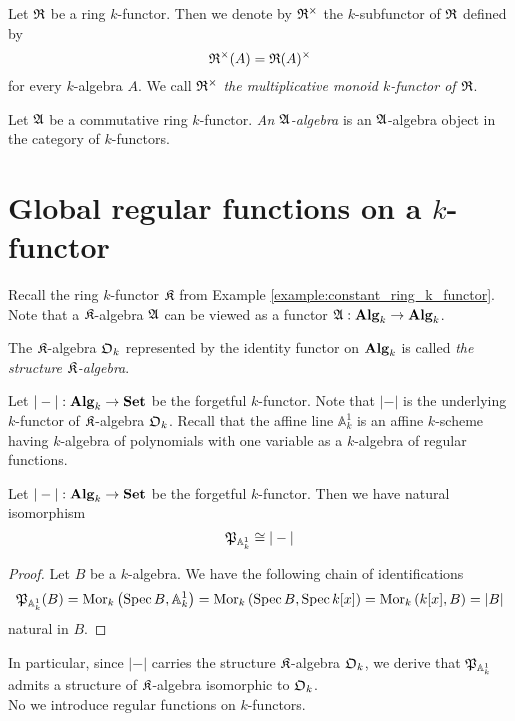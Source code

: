 \begin{definition}
Let ${\mathfrak R}$ be a ring $k$-functor. Then we denote by ${\mathfrak R}^{\times}$ the $k$-subfunctor of ${\mathfrak R}$ defined by
$${\mathfrak R}^{\times}(A) = {\mathfrak R}(A)^{\times}$$
for every $k$-algebra $A$. We call ${\mathfrak R}^{\times}$ \textit{the multiplicative monoid $k$-functor of ${\mathfrak R}$}.
\end{definition}

\begin{definition}
Let ${\mathfrak A}$ be a commutative ring $k$-functor. \textit{An ${\mathfrak A}$-algebra} is an ${\mathfrak A}$-algebra object in the category of $k$-functors.
\end{definition}

\section{Global regular functions on a $k$-functor}
\noindent
Recall the ring $k$-functor ${\mathfrak K}$ from Example \ref{example:constant_ring_k_functor}. Note that a ${\mathfrak K}$-algebra ${\mathfrak A}$ can be viewed as a functor ${\mathfrak A}:\mathbf{Alg}_k\rightarrow \mathbf{Alg}_k$.

\begin{definition}
The ${\mathfrak K}$-algebra ${\mathfrak O}_k$ represented by the identity functor on $\mathbf{Alg}_k$ is called \textit{the structure ${\mathfrak K}$-algebra}.
\end{definition}
\noindent
Let $|-|:\mathbf{Alg}_k\rightarrow \mathbf{Set}$ be the forgetful $k$-functor. Note that $|-|$ is the underlying $k$-functor of ${\mathfrak K}$-algebra ${\mathfrak O}_k$. Recall that the affine line $\mathbb{A}^1_k$ is an affine $k$-scheme having $k$-algebra of polynomials with one variable as a $k$-algebra of regular functions.

\begin{fact}\label{fact:affineline_as_forgetfulfunctor}
Let $|-|:\mathbf{Alg}_k\rightarrow \mathbf{Set}$ be the forgetful $k$-functor. Then we have natural isomorphism
$${\mathfrak P}_{\mathbb{A}^1_k} \cong |-|$$
\end{fact}
\begin{proof}
Let $B$ be a $k$-algebra. We have the following chain of identifications
$${\mathfrak P}_{\mathbb{A}^1_k}(B) = \mathrm{Mor}_k\left(\mathrm{Spec}\, B, \mathbb{A}^1_k\right) = \mathrm{Mor}_k\left(\mathrm{Spec}\, B, \mathrm{Spec}\, k[x]\right) = \mathrm{Mor}_k\left(k[x], B\right) = |B|$$
natural in $B$.
\end{proof}
\noindent
In particular, since $|-|$ carries the structure ${\mathfrak K}$-algebra ${\mathfrak O}_k$, we derive that ${\mathfrak P}_{\mathbb{A}^1_k}$ admits a structure of ${\mathfrak K}$-algebra isomorphic to ${\mathfrak O}_k$.\\
No we introduce regular functions on $k$-functors.

